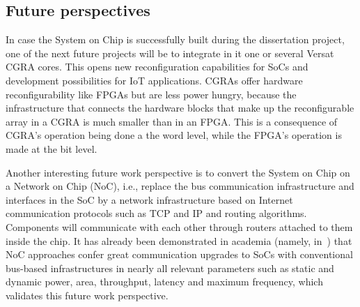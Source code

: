 \subsection{Future perspectives}

In case the \socname System on Chip is successfully built during the
dissertation project, one of the next future projects will be to integrate in it
one or several Versat~\cite{bib:versat} CGRA cores. This opens new
reconfiguration capabilities for SoCs and development possibilities for IoT
applications. CGRAs offer hardware reconfigurability like FPGAs but are less
power hungry, because the infrastructure that connects the hardware blocks that
make up the reconfigurable array in a CGRA is much smaller than in an FPGA. This
is a consequence of CGRA's operation being done a the word level, while the
FPGA's operation is made at the bit level.



Another interesting future work perspective is to convert the \socname System on
Chip on a Network on Chip (NoC), i.e., replace the bus communication
infrastructure and interfaces in the SoC by a network infrastructure based on
Internet communication protocols such as TCP and IP and routing algorithms.
Components will communicate with each other through routers attached to them
inside the chip. It has already been demonstrated in academia (namely,
in~\cite{bib:noc}) that NoC approaches confer great communication upgrades to
SoCs with conventional bus-based infrastructures in nearly all relevant
parameters such as static and dynamic power, area, throughput, latency and
maximum frequency, which validates this future work perspective.

